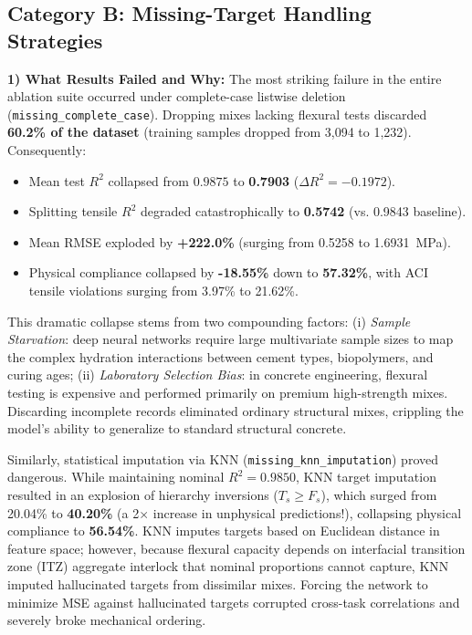 \documentclass[conference]{IEEEtran}
\begin{document}
\subsection{Category B: Missing-Target Handling Strategies}
\textbf{1) What Results Failed and Why:}
The most striking failure in the entire ablation suite occurred under complete-case listwise deletion (\texttt{missing\_complete\_case}). Dropping mixes lacking flexural tests discarded \textbf{60.2\% of the dataset} (training samples dropped from 3,094 to 1,232). Consequently:
\begin{itemize}
    \item Mean test $R^2$ collapsed from $0.9875$ to \textbf{0.7903} ($\Delta R^2 = -0.1972$).
    \item Splitting tensile $R^2$ degraded catastrophically to \textbf{0.5742} (vs. 0.9843 baseline).
    \item Mean RMSE exploded by \textbf{+222.0\%} (surging from 0.5258 to 1.6931~MPa).
    \item Physical compliance collapsed by \textbf{-18.55\%} down to \textbf{57.32\%}, with ACI tensile violations surging from 3.97\% to 21.62\%.
\end{itemize}
This dramatic collapse stems from two compounding factors: (i) \textit{Sample Starvation}: deep neural networks require large multivariate sample sizes to map the complex hydration interactions between cement types, biopolymers, and curing ages; (ii) \textit{Laboratory Selection Bias}: in concrete engineering, flexural testing is expensive and performed primarily on premium high-strength mixes. Discarding incomplete records eliminated ordinary structural mixes, crippling the model's ability to generalize to standard structural concrete.

Similarly, statistical imputation via KNN (\texttt{missing\_knn\_imputation}) proved dangerous. While maintaining nominal $R^2 = 0.9850$, KNN target imputation resulted in an explosion of hierarchy inversions ($T_s \ge F_s$), which surged from 20.04\% to \textbf{40.20\%} (a 2$\times$ increase in unphysical predictions!), collapsing physical compliance to \textbf{56.54\%}. KNN imputes targets based on Euclidean distance in feature space; however, because flexural capacity depends on interfacial transition zone (ITZ) aggregate interlock that nominal proportions cannot capture, KNN imputed hallucinated targets from dissimilar mixes. Forcing the network to minimize MSE against hallucinated targets corrupted cross-task correlations and severely broke mechanical ordering.
\end{document}

